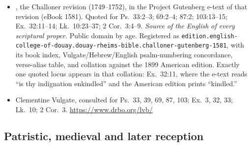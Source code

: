 \begin{itemize}[leftmargin=1.2em, itemsep=0.15em]
\item {}, the Challoner revision
(1749--1752), in the Project Gutenberg e-text of that revision (eBook 1581).
Quoted for Ps.\ 33:2--3; 69:2--4; 87:2; 103:13--15; Ex.\ 32:11--14; Lk.\
10:23--37; 2 Cor.\ 3:4--9. \textit{Source of the English of every scriptural
proper.} Public domain by age. Registered as
\nolinkurl{edition.english-college-of-douay.douay-rheims-bible.challoner-gutenberg-1581},
with its book index, Vulgate/Hebrew/English psalm-numbering concordance,
verse-alias table, and collation against the 1899 American edition. Exactly
one quoted locus appears in that collation: Ex.\ 32:11, where the e-text reads
``is thy indignation enkindled'' and the American edition prints ``kindled.''
\item Clementine Vulgate, consulted for Ps.\ 33, 39, 69, 87, 103; Ex.\ 3, 32,
33; Lk.\ 10; 2 Cor.\ 3. \url{https://www.drbo.org/lvb/}
\end{itemize}

\subsection*{Patristic, medieval and later reception}


